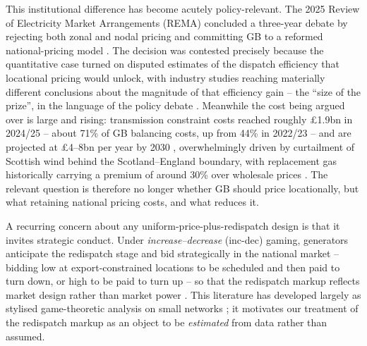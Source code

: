 \documentclass[review,3p,times]{elsarticle}
\theoremstyle{plain}
\theoremstyle{definition}
\begin{document}


This institutional difference has become acutely policy-relevant. The 2025 Review
of Electricity Market Arrangements (REMA) concluded a three-year debate by
rejecting both zonal and nodal pricing and committing GB to a reformed
national-pricing model \citep{rema2025}. The decision was contested precisely
because the quantitative case turned on disputed estimates of the dispatch
efficiency that locational pricing would unlock, with industry studies reaching
materially different conclusions about the magnitude of that efficiency
gain -- the ``size of the prize'', in the language of the policy
debate \citep{afry2025, ukerc2023}. Meanwhile the cost being argued over is large and rising:
transmission constraint costs reached roughly \pounds1.9bn in 2024/25 -- about
71\% of GB balancing costs, up from 44\% in 2022/23 -- and are projected at
\pounds4--8bn per year by 2030 \citep{neso2025, neso_swr2025}, overwhelmingly driven by curtailment of Scottish
wind behind the Scotland--England boundary, with replacement gas historically
carrying a premium of around 30\% over wholesale prices
\citep{neso2025, modo2025}. The relevant question is therefore no longer whether
GB should price locationally, but what retaining national pricing costs, and what
reduces it.

A recurring concern about any uniform-price-plus-redispatch design is that it
invites strategic conduct. Under \emph{increase--decrease} (inc-dec) gaming,
generators anticipate the redispatch stage and bid strategically in the national
market -- bidding low at export-constrained locations to be scheduled and then
paid to turn down, or high to be paid to turn up -- so that the redispatch markup
reflects market design rather than market power
\citep{hirthschlecht2019, holmberglazarczyk2015}. This literature
has developed largely as stylised game-theoretic analysis on small networks \citep{holmberg2024}; it
motivates our treatment of the redispatch markup as an object to be
\emph{estimated} from data rather than assumed.
\end{document}
